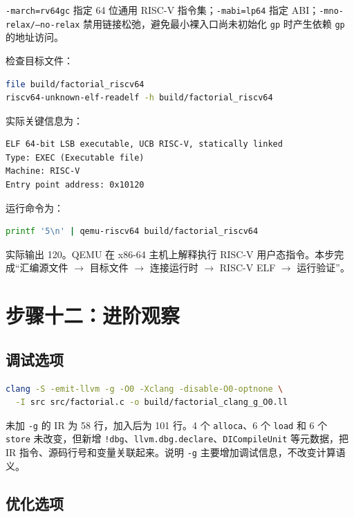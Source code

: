 \documentclass[UTF8,a4paper,12pt]{ctexart}
\begin{document}
\texttt{-march=rv64gc} 指定 64 位通用 RISC-V 指令集；\texttt{-mabi=lp64} 指定 ABI；\texttt{-mno-relax/--no-relax} 禁用链接松弛，避免最小裸入口尚未初始化 \texttt{gp} 时产生依赖 \texttt{gp} 的地址访问。

检查目标文件：

\begin{lstlisting}[language=bash]
file build/factorial_riscv64
riscv64-unknown-elf-readelf -h build/factorial_riscv64
\end{lstlisting}

实际关键信息为：

\begin{lstlisting}
ELF 64-bit LSB executable, UCB RISC-V, statically linked
Type: EXEC (Executable file)
Machine: RISC-V
Entry point address: 0x10120
\end{lstlisting}

运行命令为：

\begin{lstlisting}[language=bash]
printf '5\n' | qemu-riscv64 build/factorial_riscv64
\end{lstlisting}

实际输出 120。QEMU 在 x86-64 主机上解释执行 RISC-V 用户态指令。本步完成“汇编源文件 $\rightarrow$ 目标文件 $\rightarrow$ 连接运行时 $\rightarrow$ RISC-V ELF $\rightarrow$ 运行验证”。

\section{步骤十二：进阶观察}

\subsection{调试选项}

\begin{lstlisting}[language=bash]
clang -S -emit-llvm -g -O0 -Xclang -disable-O0-optnone \
  -I src src/factorial.c -o build/factorial_clang_g_O0.ll
\end{lstlisting}

未加 \texttt{-g} 的 IR 为 58 行，加入后为 101 行。4 个 \texttt{alloca}、6 个 \texttt{load} 和 6 个 \texttt{store} 未改变，但新增 \texttt{!dbg}、\texttt{llvm.dbg.declare}、\texttt{DICompileUnit} 等元数据，把 IR 指令、源码行号和变量关联起来。说明 \texttt{-g} 主要增加调试信息，不改变计算语义。

\subsection{优化选项}
\end{document}
